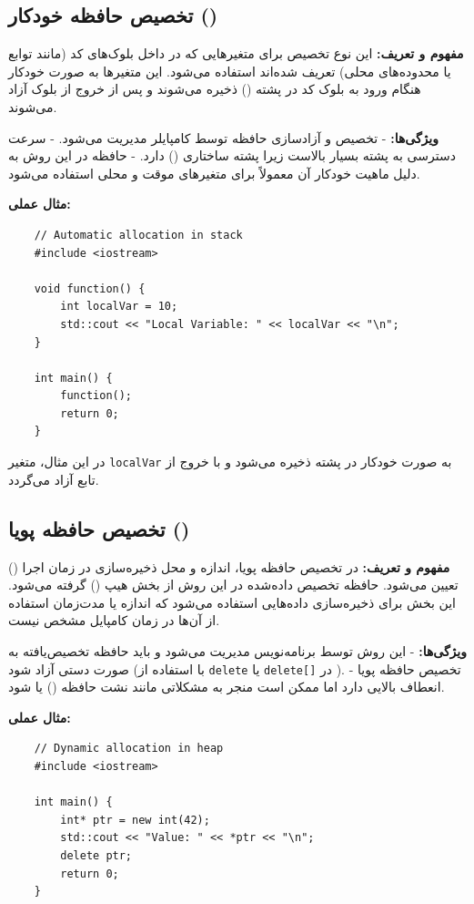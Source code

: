 \documentclass[12pt, a4paper]{report}
\begin{document}
\subsection{ تخصیص حافظه خودکار ()}

\textbf{مفهوم و تعریف:}  
این نوع تخصیص برای متغیرهایی که در داخل بلوک‌های کد (مانند توابع یا محدوده‌های محلی) تعریف شده‌اند استفاده می‌شود. این متغیرها به صورت خودکار هنگام ورود به بلوک کد در پشته () ذخیره می‌شوند و پس از خروج از بلوک آزاد می‌شوند.

\textbf{ویژگی‌ها:}  
- تخصیص و آزادسازی حافظه توسط کامپایلر مدیریت می‌شود.  
- سرعت دسترسی به پشته بسیار بالاست زیرا پشته ساختاری  () دارد.  
- حافظه در این روش به دلیل ماهیت خودکار آن معمولاً برای متغیرهای موقت و محلی استفاده می‌شود.  

\textbf{مثال عملی:}
\LTR
\begin{lstlisting}
	// Automatic allocation in stack
	#include <iostream>
	
	void function() {
		int localVar = 10; 
		std::cout << "Local Variable: " << localVar << "\n";
	}
	
	int main() {
		function();
		return 0;
	}
\end{lstlisting}
\RTL

در این مثال، متغیر \texttt{localVar} به صورت خودکار در پشته ذخیره می‌شود و با خروج از تابع آزاد می‌گردد.

\subsection{ تخصیص حافظه پویا ()}

\textbf{مفهوم و تعریف:}  
در تخصیص حافظه پویا، اندازه و محل ذخیره‌سازی در زمان اجرا () تعیین می‌شود. حافظه تخصیص داده‌شده در این روش از بخش هیپ () گرفته می‌شود. این بخش برای ذخیره‌سازی داده‌هایی استفاده می‌شود که اندازه یا مدت‌زمان استفاده از آن‌ها در زمان کامپایل مشخص نیست.

\textbf{ویژگی‌ها:}  
- این روش توسط برنامه‌نویس مدیریت می‌شود و باید حافظه تخصیص‌یافته به صورت دستی آزاد شود (با استفاده از \texttt{delete} یا \texttt{delete[]} در ).  
- تخصیص حافظه پویا انعطاف بالایی دارد اما ممکن است منجر به مشکلاتی مانند نشت حافظه () یا  شود.  

\textbf{مثال عملی:}
\LTR
\begin{lstlisting}
	// Dynamic allocation in heap
	#include <iostream>
	
	int main() {
		int* ptr = new int(42); 
		std::cout << "Value: " << *ptr << "\n";
		delete ptr; 
		return 0;
	}
\end{lstlisting}
\RTL
\end{document}
